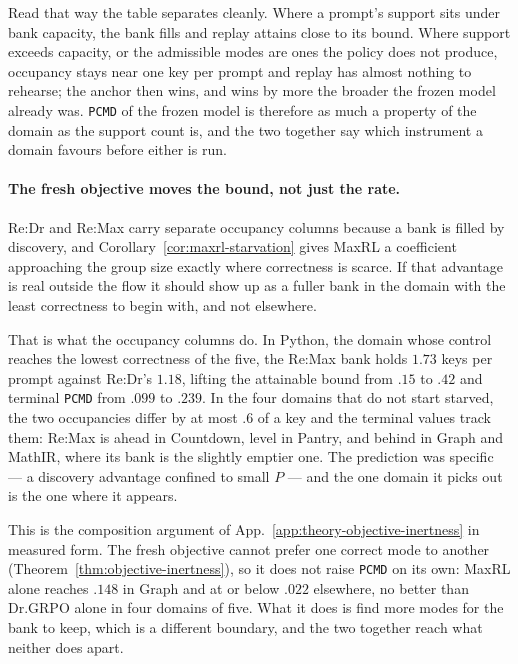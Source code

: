 \documentclass{article}
\newcommand{\1}{\mathbf 1}
\newcommand{\pmd}{\texttt{PCMD}}
\theoremstyle{remark}
\theoremstyle{definition}
\theoremstyle{plain}
\begin{document}
Read that way the table separates cleanly. Where a prompt's support sits under
bank capacity, the bank fills and replay attains close to its bound. Where
support exceeds capacity, or the admissible modes are ones the policy does not
produce, occupancy stays near one key per prompt and replay has almost nothing
to rehearse; the anchor then wins, and wins by more the broader the frozen
model already was. \pmd{} of the frozen model is therefore as much a property
of the domain as the support count is, and the two together say which
instrument a domain favours before either is run.

\paragraph{The fresh objective moves the bound, not just the rate.}
Re:Dr and Re:Max carry separate occupancy columns because a bank is filled by
discovery, and Corollary~\ref{cor:maxrl-starvation} gives MaxRL a coefficient
approaching the group size exactly where correctness is scarce. If that
advantage is real outside the flow it should show up as a fuller bank in the
domain with the least correctness to begin with, and not elsewhere.

That is what the occupancy columns do. In Python, the domain whose control
reaches the lowest correctness of the five, the Re:Max bank holds $1.73$ keys
per prompt against Re:Dr's $1.18$, lifting the attainable bound from $.15$ to
$.42$ and terminal \pmd{} from $.099$ to $.239$. In the four domains that do
not start starved, the two occupancies differ by at most $.6$ of a key and the
terminal values track them: Re:Max is ahead in Countdown, level in Pantry, and
behind in Graph and MathIR, where its bank is the slightly emptier one. The
prediction was specific --- a discovery advantage confined to small $P$ --- and
the one domain it picks out is the one where it appears.

This is the composition argument of App.~\ref{app:theory-objective-inertness}
in measured form. The fresh objective cannot prefer one correct mode to another
(Theorem~\ref{thm:objective-inertness}), so it does not raise \pmd{} on its own:
MaxRL alone reaches $.148$ in Graph and at or below $.022$ elsewhere, no better
than Dr.GRPO alone in four domains of five. What it does is find more modes for
the bank to keep, which is a different boundary, and the two together reach
what neither does apart.
\end{document}
